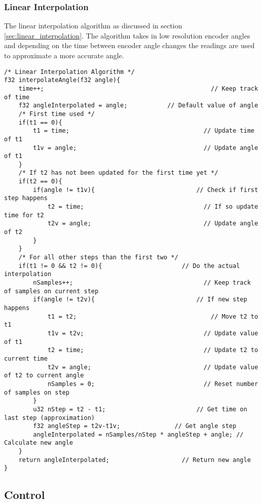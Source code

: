 \subsubsection{Linear Interpolation}
The linear interpolation algorithm as discussed in section \ref{sec:linear_interpolation}. The algorithm takes in low resolution encoder angles and depending on the time between encoder angle changes the readings are used to approximate a more accurate angle.
\begin{lstlisting}[style=c, caption=Implemetation of angle intepolation algorithm., label=app:code:interpolateAngle]
/* Linear Interpolation Algorithm */
f32 interpolateAngle(f32 angle){
	time++;								                 // Keep track of time
	f32 angleInterpolated = angle;		     // Default value of angle
	/* First time used */
	if(t1 == 0){
		t1 = time;						               // Update time of t1
		t1v = angle;					               // Update angle of t1
	}
	/* If t2 has not been updated for the first time yet */
	if(t2 == 0){
		if(angle != t1v){				             // Check if first step happens
			t2 = time;					               // If so update time for t2
			t2v = angle;				               // Update angle of t2
		}
	}
	/* For all other steps than the first two */
	if(t1 != 0 && t2 != 0){				         // Do the actual interpolation
		nSamples++;						               // Keep track of samples on current step
		if(angle != t2v){				             // If new step happens
			t1 = t2;					                 // Move t2 to t1
			t1v = t2v;					               // Update value of t1
			t2 = time;					               // Update t2 to current time
			t2v = angle;				               // Update value of t2 to current angle
			nSamples = 0;				               // Reset number of samples on step
		}
 		u32 nStep = t2 - t1;				         // Get time on last step (approximation)
		f32 angleStep = t2v-t1v;	           // Get angle step
		angleInterpolated = nSamples/nStep * angleStep + angle; // Calculate new angle
	}
	return angleInterpolated;			         // Return new angle
}
\end{lstlisting}

\newpage
\subsection{Control}
